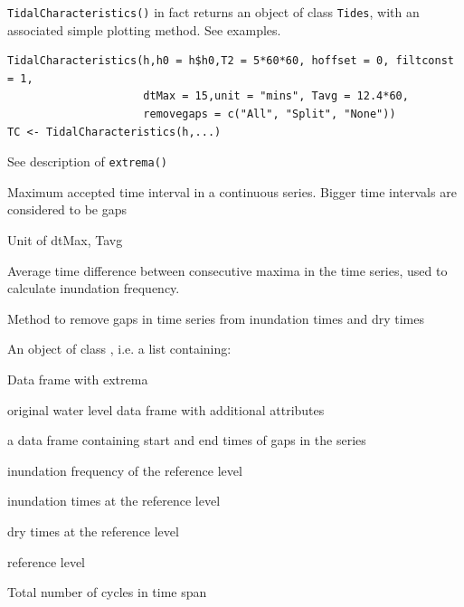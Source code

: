 \documentclass[10pt,a4wide]{article}
\begin{document}
\texttt{TidalCharacteristics()} in fact returns an object of class \texttt{Tides}, with an associated simple plotting method. See examples. 
\begin{Usage}
\begin{verbatim}TidalCharacteristics(h,h0 = h$h0,T2 = 5*60*60, hoffset = 0, filtconst = 1, 
                     dtMax = 15,unit = "mins", Tavg = 12.4*60,
                     removegaps = c("All", "Split", "None")) 
TC <- TidalCharacteristics(h,...)\end{verbatim}
\end{Usage}
\begin{Arguments}
\begin{ldescription}
\item[\code{h, h0, T2, hoffset, filtconst }] See description of \texttt{extrema()}
\item[\code{dtMax}] Maximum accepted time interval in a continuous series. Bigger time intervals are considered to be gaps
\item[\code{unit}] Unit of dtMax, Tavg
\item[\code{Tavg}] Average time difference between consecutive maxima in the time series, used to calculate inundation frequency.
\item[\code{removegaps}}] Method to remove gaps in time series from inundation times and dry times
\end{ldescription}
\end{Arguments}
\begin{Value}
An object of class , i.e. a list containing:
\begin{ldescription}
\item[\code{HL }] Data frame with extrema
\item[\code{h }] original water level data frame with additional attributes
\item[\code{gaps}] a data frame containing start and end times of gaps in the series
\item[\code{IF}] inundation frequency of the reference level
\item[\code{ITs}] inundation times at the reference level
\item[\code{DTs}] dry times at the reference level
\item[\code{h0}] reference level
\item[\code{N}] Total number of cycles in time span
\end{ldescription}
\end{Value}
\end{document}
